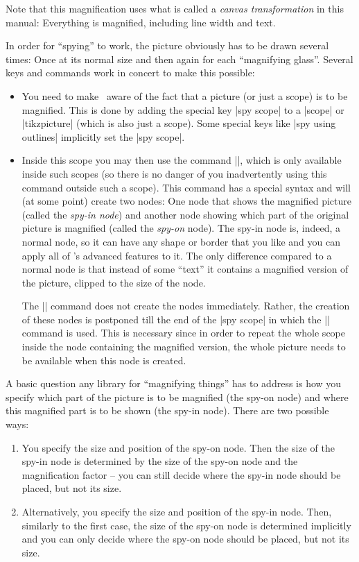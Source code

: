 Note that this magnification uses what is called a \emph{canvas transformation}
in this manual: Everything is magnified, including line width and text.

In order for ``spying'' to work, the picture obviously has to be drawn several
times: Once at its normal size and then again for each ``magnifying glass''.
Several keys and commands work in concert to make this possible:
%
\begin{itemize}
    \item You need to make \tikzname\ aware of the fact that a picture (or just
        a scope) is to be magnified. This is done by adding the special key
        |spy scope| to a |{scope}| or |{tikzpicture}| (which is also just a
        scope). Some special keys like |spy using outlines| implicitly set the
        |spy scope|.
    \item Inside this scope you may then use the command |\spy|, which is only
        available inside such scopes (so there is no danger of you
        inadvertently using this command outside such a scope). This command
        has a special syntax and will (at some point) create two nodes: One
        node that shows the magnified picture (called the \emph{spy-in node})
        and another node showing which part of the original picture is
        magnified (called the \emph{spy-on} node). The spy-in node is, indeed,
        a normal node, so it can have any shape or border that you like and you
        can apply all of \tikzname's advanced features to it. The only
        difference compared to a normal node is that instead of some ``text''
        it contains a magnified version of the picture, clipped to the size of
        the node.

        The |\spy| command does not create the nodes immediately. Rather, the
        creation of these nodes is postponed till the end of the |spy scope| in
        which the |\spy| command is used. This is necessary since in order to
        repeat the whole scope inside the node containing the magnified
        version, the whole picture needs to be available when this node is
        created.
\end{itemize}

A basic question any library for ``magnifying things'' has to address is how
you specify which part of the picture is to be magnified (the spy-on node) and
where this magnified part is to be shown (the spy-in node). There are two
possible ways:
%
\begin{enumerate}
    \item You specify the size and position of the spy-on node. Then the size
        of the spy-in node is determined by the size of the spy-on node and the
        magnification factor -- you can still decide where the spy-in node
        should be placed, but not its size.
    \item Alternatively, you specify the size and position of the spy-in node.
        Then, similarly to the first case, the size of the spy-on node is
        determined implicitly and you can only decide where the spy-on node
        should be placed, but not its size.
\end{enumerate}

